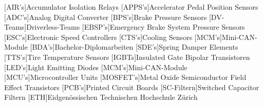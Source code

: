 \begin{acronym}[acronyms]
		[AIR's]{Accumulator Isolation Relays}
		[APPS's]{Accelerator Pedal Position Sensors}
		[ADC's]{Analog Digital Converter}
		[BPS's]{Brake Pressure Sensors}
		[DV-Teams]{Driverless-Teams}
		[EBSP's]{Emergency Brake System Pressure Sensors}
		[ESC's]{Electronic Speed Controllers}
		[CTS's]{Cooling Sensors}
		[MCM's]{Mini-CAN-Module}
		[BDA's]{Bachelor-Diplomarbeiten}
		[SDE's]{Spring Damper Elements}
		[TTS's]{Tire Temperature Sensors}
		[IGBTs]{Insulated Gate Bipolar Transistoren}
		[LED's]{Light Emitting Diodes}
		[MCM's]{Mini-CAN-Module}
		[MCU's]{Microcontroller Units}
		[MOSFET's]{Metal Oxide Semiconductor Field Effect Transistors}
		[PCB's]{Printed Circuit Boards}
		[SC-Filtern]{Switched Capacitor Filtern}
		[ETH]{Eidgenössischen Technischen Hochschule Zürich}
\end{acronym}
